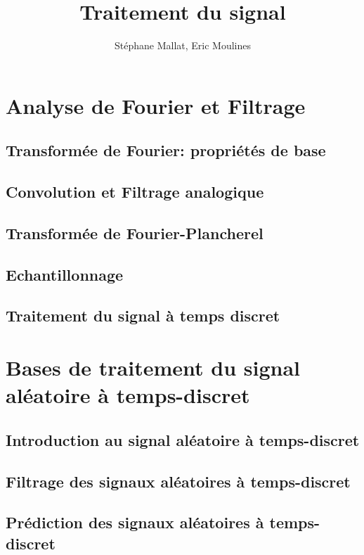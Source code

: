 \documentclass[graybox,envcountchap,envcountsame,sectrefs]{svmono}
\title{Traitement du signal}
\author{St\'ephane Mallat, Eric Moulines}
\begin{document}
\maketitle
\tableofcontents
\part{Analyse de Fourier et Filtrage}
\chapter{Transformée de Fourier: propriétés de base}


\chapter{Convolution et Filtrage analogique}

\chapter{Transformée de Fourier-Plancherel}

\chapter{Echantillonnage}

\chapter{Traitement du signal \`a temps discret}
\label{discret-chap}


\part{Bases de traitement du signal al\'eatoire \`a temps-discret}
\chapter{Introduction au signal al\'eatoire \`a temps-discret}


\chapter{Filtrage des signaux al\'eatoires \`a temps-discret}

\chapter{Pr\'ediction des signaux al\'eatoires à temps-discret}
\label{chap:Prediction}

\end{document}
